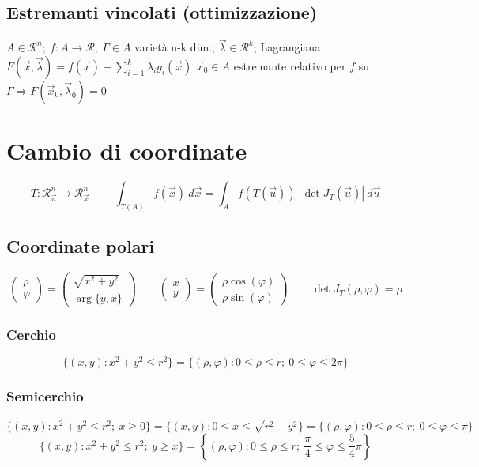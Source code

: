 \documentclass[]{article}
\newcommand{\ux}{\vec{x}}
\newcommand{\ul}{\vec{\lambda}}
\newcommand{\xy}{(x,y):}
\newcommand{\rp}{(\rho,\varphi):}
\begin{document}
\subsection{Estremanti vincolati (ottimizzazione)}
\(A\in\mathcal{R}^n; \ f:A\to\mathcal{R}; \ \Gamma \in A\) varietà n-k dim.; \(\ul\in\mathcal{R}^k\); Lagrangiana \(F(\ux,\ul)=f(\ux)-\sum_{i=1}^{k}{\lambda_i g_i(\ux)}\)\newline
\(\ux_0\in A\) estremante relativo per \(f\) su \(\Gamma \Rightarrow F(\ux_0,\ul_0)=0\)

\section{Cambio di coordinate}
\[T:\mathcal{R}_{\vec{u}}^n\to\mathcal{R}_{\ux}^n \qquad \ \int_{T(A)} f(\ux) \ d\ux=\int_A f(T(\vec{u})) \ |\det J_T(\vec{u})| \ d\vec{u}\]

\subsection{Coordinate polari}
\[\left(\begin{array}{c}
\rho \\ \varphi
\end{array}\right)=\left(\begin{array}{c}
\sqrt{x^2+y^2} \\ \arg\{y,x\}
\end{array}\right) \qquad
\left(\begin{array}{c}
x \\ y
\end{array}\right)=\left(\begin{array}{c}
\rho\cos(\varphi) \\ \rho\sin(\varphi)
\end{array}\right) \qquad
\det J_T(\rho,\varphi)=\rho
\]

\subsubsection{Cerchio}
\[
\{\xy x^2+y^2 \le r^2 \}=\{\rp 0 \le\rho\le r; \ 0 \le\varphi\le 2\pi \}
\]

\subsubsection{Semicerchio}
\[
\{\xy x^2+y^2 \le r^2; \ x \ge 0 \}=\{\xy 0 \le x \le \sqrt{r^2-y^2} \}=\{\rp 0 \le\rho\le r; \ 0 \le\varphi\le \pi \}
\]
\[
\{\xy x^2+y^2 \le r^2; \ y \ge x \}=\left\{\rp 0 \le\rho\le r; \ \frac{\pi}{4} \le\varphi\le \frac{5}{4}\pi \right\}
\]
\end{document}
